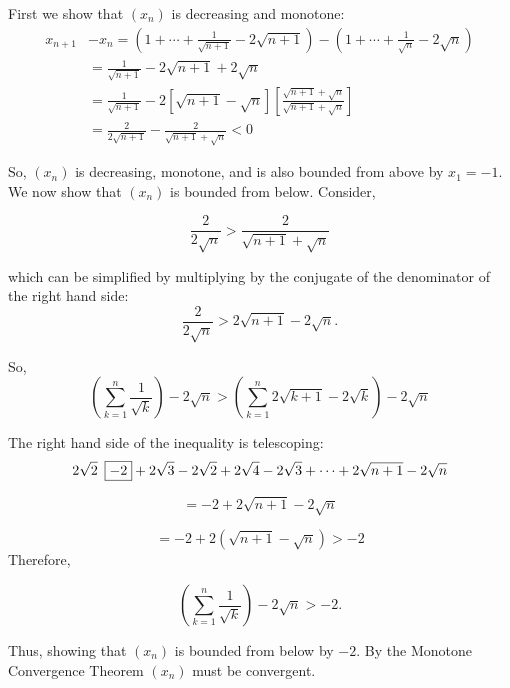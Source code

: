 \documentclass{report}
\begin{document}
\begin{myproof}
  First we show that $(x_n)$ is decreasing and monotone:
$$
\begin{aligned}
  x_{n+1} & -x_n=\left(1+\cdots+\frac{1}{\sqrt{n+1}}-2 \sqrt{n+1}\right)-\left(1+\cdots+\frac{1}{\sqrt{n}} - 2 \sqrt{n}\right) \\
& =\frac{1}{\sqrt{n+1}}-2 \sqrt{n+1}+2 \sqrt{n} \\
& =\frac{1}{\sqrt{n+1}}-2[\sqrt{n+1}-\sqrt{n}]\left[\frac{\sqrt{n+1}+\sqrt{n}}{\sqrt{n+1}+\sqrt{n}}\right] \\
& =\frac{2}{2\sqrt{n+1}}-\frac{2}{\sqrt{n+1}+\sqrt{n}}<0
\end{aligned}
$$

So, $\left(x_n\right)$ is decreasing, monotone, and is also bounded from above by $x_1 =-1.$
We now show that $(x_n)$ is bounded from below. Consider,

$$\frac{2}{2 \sqrt{n}} > \frac{2}{\sqrt{n+1} + \sqrt{n}}$$

which can be simplified by multiplying by the conjugate of the denominator of the right hand side:
 $$\frac{2}{2 \sqrt{n}} > 2\sqrt{n+1} - 2\sqrt{n}.$$
 

 So,
 $$
\left(\sum_{k=1}^{n} \frac{1}{\sqrt{k}} \right)-2 \sqrt{n} > \left( \sum_{k=1}^{n} 2\sqrt{k+1} - 2\sqrt{k} \right) - 2\sqrt{n}
 $$

The right hand side of the inequality is telescoping:
 $$
 2\sqrt{2} \hspace{0.5em}\boxed{-2} + 2\sqrt{3}- 2\sqrt{2} + 2\sqrt{4} - 2\sqrt{3}+ \cdots + 2\sqrt{n+1} - 2\sqrt{n}
$$

 $$
 = -2  + 2\sqrt{n+1}- 2\sqrt{n}
$$

 $$
 = -2  + 2(\sqrt{n+1}- \sqrt{n}) > -2
$$
Therefore,

$$\left(\sum_{k=1}^{n} \frac{1}{\sqrt{k}} \right)-2 \sqrt{n} > -2.$$

Thus, showing that $(x_n)$ is bounded from below by $-2$. By the Monotone Convergence Theorem $(x_n)$ must be convergent.

\end{myproof}

\end{document}

